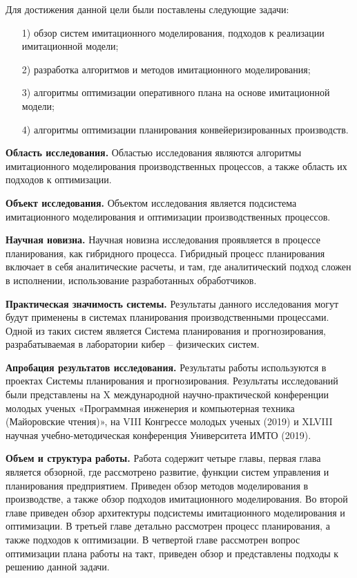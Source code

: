 Для достижения данной цели были поставлены следующие задачи:

\begin{enumerate}
    \item [1)] обзор систем имитационного моделирования, подходов к реализации имитационной модели;
    \item [2)] разработка алгоритмов и методов имитационного моделирования;
    \item [3)] алгоритмы оптимизации оперативного плана на основе имитационной модели;
    \item [4)] алгоритмы оптимизации планирования конвейеризированных производств.
\end{enumerate}

\textbf{Область исследования.} Областью исследования являются алгоритмы имитационного моделирования производственных процессов, а также область их подходов к оптимизации.

\textbf{Объект исследования.} Объектом исследования является подсистема имитационного моделирования и оптимизации производственных процессов.

\textbf{Научная новизна.} Научная новизна исследования проявляется в процессе планирования, как гибридного процесса. Гибридный процесс планирования включает в себя аналитические расчеты, и там, где аналитический подход сложен в исполнении, использование разработанных обработчиков.

\textbf{Практическая значимость системы.} Результаты данного исследования могут будут применены в системах планирования производственными процессами. Одной из таких систем является Система планирования и прогнозирования, разрабатываемая в лаборатории кибер – физических систем.

\textbf{Апробация результатов исследования.} Результаты работы используются в проектах Системы планирования и прогнозирования. Результаты исследований были представлены на X международной научно-практической конференции молодых ученых «Программная инженерия и компьютерная техника (Майоровские чтения)», на VIII Конгрессе молодых ученых (2019) и XLVIII научная учебно-методическая конференция Университета ИМТО (2019).

\textbf{Объем и структура работы.} Работа содержит четыре главы, первая глава является обзорной, где рассмотрено развитие, функции систем управления и планирования предприятием. Приведен обзор методов моделирования в производстве, а также обзор подходов имитационного моделирования. Во второй главе приведен обзор архитектуры подсистемы имитационного моделирования и оптимизации. В третьей главе детально рассмотрен процесс планирования, а также подходов к оптимизации. В четвертой главе рассмотрен вопрос оптимизации плана работы на такт, приведен обзор и представлены подходы к решению данной задачи.

